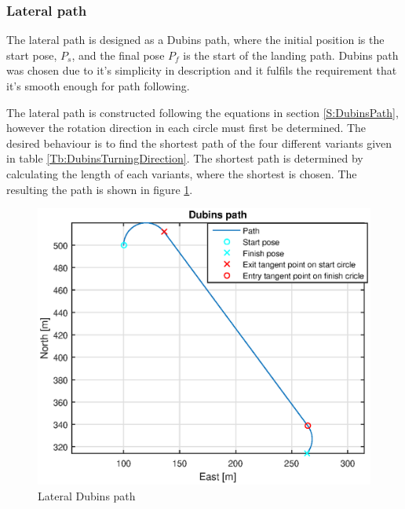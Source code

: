\subsubsection{Lateral path}
The lateral path is designed as a Dubins path, where the initial position is the start pose, $P_s$, and the final pose $P_f$ is the start of the landing path. Dubins path was chosen due to it's simplicity in description and it fulfils the requirement that it's smooth enough for path following.

The lateral path is constructed following the equations in section \ref{S:DubinsPath}, however the rotation direction in each circle must first be determined. The desired behaviour is to find the shortest path of the four different variants given in table \ref{Tb:DubinsTurningDirection}. The shortest path is determined by calculating the length of each variants, where the shortest is chosen. The resulting the path is shown in figure \ref{Fig:LateralPath}.
\begin{figure}[H]
	\centering
		\includegraphics[width=1\textwidth]{figs/SysPlot/DubinsPath.eps}
		\caption{Lateral Dubins path}
		\label{Fig:LateralPath}
\end{figure}

